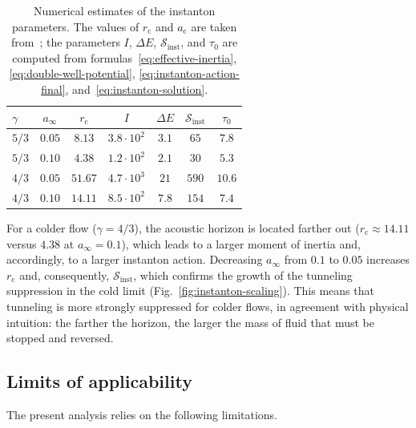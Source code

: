\documentclass[12pt,a4paper,preprint]{elsarticle}
\begin{document}
            \begin{table}[htb]
                \centering
                \caption{Numerical estimates of the instanton parameters. The values of $r_{\mathrm{c}}$ and $a_{\mathrm{c}}$ are taken from~\cite{SemyannikovAV_AcousticGeometryAndSoundRayDynamicsInRelativisticSphericalAccretion_2026}; the parameters $I$, $\Delta E$, $\mathcal{S}_{\mathrm{inst}}$, and $\tau_{0}$ are computed from formulas~\eqref{eq:effective-inertia}, \eqref{eq:double-well-potential}, \eqref{eq:instanton-action-final}, and~\eqref{eq:instanton-solution}.}
                \label{tab:instanton-parameters}
                \small
                \begin{tabular}{lcccccc}
                    \toprule
                    $\gamma$ & $a_{\infty}$ & $r_{\mathrm{c}}$ & $I$ & $\Delta E$ & $\mathcal{S}_{\mathrm{inst}}$ & $\tau_{0}$ \\
                    \midrule
                    $5/3$ & $0.05$ & $8.13$ & $3.8 \cdot 10^{2}$ & $3.1$ & $65$ & $7.8$ \\
                    $5/3$ & $0.10$ & $4.38$ & $1.2 \cdot 10^{2}$ & $2.1$ & $30$ & $5.3$ \\
                    \midrule
                    $4/3$ & $0.05$ & $51.67$ & $4.7 \cdot 10^{3}$ & $21$ & $590$ & $10.6$ \\
                    $4/3$ & $0.10$ & $14.11$ & $8.5 \cdot 10^{2}$ & $7.8$ & $154$ & $7.4$ \\
                    \bottomrule
                \end{tabular}
            \end{table}
            
            For a colder flow ($\gamma = 4/3$), the acoustic horizon is located farther out ($r_{\mathrm{c}} \approx 14.11$ versus $4.38$ at $a_{\infty} = 0.1$), which leads to a larger moment of inertia and, accordingly, to a larger instanton action. Decreasing $a_{\infty}$ from $0.1$ to $0.05$ increases $r_{\mathrm{c}}$ and, consequently, $\mathcal{S}_{\mathrm{inst}}$, which confirms the growth of the tunneling suppression in the cold limit (Fig.~\ref{fig:instanton-scaling}). This means that tunneling is more strongly suppressed for colder flows, in agreement with physical intuition: the farther the horizon, the larger the mass of fluid that must be stopped and reversed.

        \subsection{Limits of applicability}\label{subsec:limitations}
            The present analysis relies on the following limitations.
            
\end{document}

